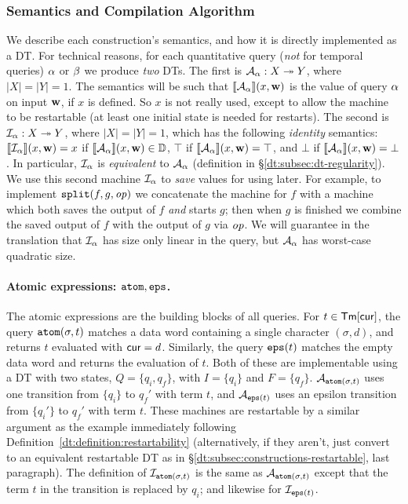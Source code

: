 \subsubsection{Semantics and Compilation Algorithm}
\label{dt:subsec:rm-compilation}

We describe each construction's semantics, and how it is directly implemented as a DT.
For technical reasons, for each quantitative query (\emph{not} for temporal queries) $\alpha$ or $\beta$ we produce \emph{two} DTs. The first is $\mathcal{A}_{\alpha}: X \twoheadrightarrow Y$, where $|X| = |Y| = 1$. The semantics will be such that $\llbracket \mathcal{A}_{\alpha} \rrbracket(x,\textbf{w})$ is the value of query $\alpha$ on input $\textbf{w}$, if $x$ is defined. So $x$ is not really used, except to allow the machine to be restartable (at least one initial state is needed for restarts). The second is $\mathcal{I}_{\alpha}: X \twoheadrightarrow Y$, where $|X|=|Y|=1$, which has the following \emph{identity} semantics: $\llbracket \mathcal{I}_{\alpha} \rrbracket(x,\textbf{w}) = x$ if $\llbracket \mathcal{A}_{\alpha} \rrbracket(x,\textbf{w}) \in \mathbb{D}$, $\top$ if $\llbracket \mathcal{A}_{\alpha} \rrbracket(x,\textbf{w}) = \top$, and $\bot$ if $\llbracket \mathcal{A}_{\alpha} \rrbracket(x,\textbf{w}) = \bot$.
In particular, $\mathcal{I}_{\alpha}$ is \emph{equivalent} to $\mathcal{A}_{\alpha}$ (definition in \S\ref{dt:subsec:dt-regularity}).
We use this second machine $\mathcal{I}_{\alpha}$ to \emph{save} values for using later. For example, to implement $\texttt{split}(f,g,\mathit{op})$ we concatenate the machine for $f$ with a machine which both saves the output of $f$ \emph{and} starts $g$; then when $g$ is finished we combine the saved output of $f$ with the output of $g$ via $\mathit{op}$. We will guarantee in the translation that $\mathcal{I}_{\alpha}$ has size only linear in the query, but $\mathcal{A}_{\alpha}$ has worst-case quadratic size.

\paragraph*{Atomic expressions: $\texttt{atom}, \texttt{eps}$.}
The atomic expressions are the building blocks of all queries. For $t \in \textsf{Tm}[\mathsf{cur}]$, the query $\texttt{atom}(\sigma, t)$ matches a data word containing a single character $(\sigma, d)$, and returns $t$ evaluated with $\mathsf{cur} = d$. Similarly, the query $\texttt{eps}(t)$ matches the empty data word and returns the evaluation of $t$.
Both of these are implementable using a DT with two states, $Q = \{q_i, q_f\}$, with $I = \{q_i\}$ and $F = \{q_f\}$.
$\mathcal{A}_{\texttt{atom}(\sigma, t)}$ uses one transition from $\{q_i\}$ to $q_f'$ with term $t$, and $\mathcal{A}_{\texttt{eps}(t)}$ uses an epsilon transition from $\{q_i'\}$ to $q_f'$ with term $t$.
These machines are restartable by a similar argument as the example immediately following Definition~\ref{dt:definition:restartability} (alternatively, if they aren't, just convert to an equivalent restartable DT as in \S\ref{dt:subsec:constructions-restartable}, last paragraph).
The definition of $\mathcal{I}_{\texttt{atom}(\sigma, t)}$ is the same as $\mathcal{A}_{\texttt{atom}(\sigma, t)}$ except that the term $t$ in the transition is replaced by $q_i$; and likewise for $\mathcal{I}_{\texttt{eps}(t)}$.

